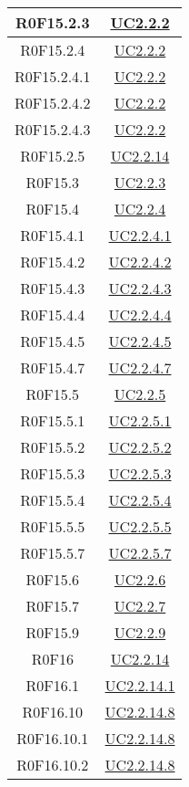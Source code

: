 \documentclass[../AnalisiDeiRequisiti.tex]{subfiles}
\begin{document}
\begin{longtable}{|c|c|}
	R0F15.2.3 & \hyperlink{UC2.2.2}{UC2.2.2}\\\hline
	R0F15.2.4 & \hyperlink{UC2.2.2}{UC2.2.2}\\\hline
	R0F15.2.4.1 & \hyperlink{UC2.2.2}{UC2.2.2}\\\hline
	R0F15.2.4.2 & \hyperlink{UC2.2.2}{UC2.2.2}\\\hline
	R0F15.2.4.3 & \hyperlink{UC2.2.2}{UC2.2.2}\\\hline
	R0F15.2.5 & \hyperlink{UC2.2.14}{UC2.2.14}\\\hline
	R0F15.3 & \hyperlink{UC2.2.3}{UC2.2.3}\\\hline
	R0F15.4 & \hyperlink{UC2.2.4}{UC2.2.4}\\\hline
	R0F15.4.1 & \hyperlink{UC2.2.4.1}{UC2.2.4.1}\\\hline
	R0F15.4.2 & \hyperlink{UC2.2.4.2}{UC2.2.4.2}\\\hline
	R0F15.4.3 & \hyperlink{UC2.2.4.3}{UC2.2.4.3}\\\hline
	R0F15.4.4 & \hyperlink{UC2.2.4.4}{UC2.2.4.4}\\\hline
	R0F15.4.5 & \hyperlink{UC2.2.4.5}{UC2.2.4.5}\\\hline
	R0F15.4.7 & \hyperlink{UC2.2.4.7}{UC2.2.4.7}\\\hline
	R0F15.5 & \hyperlink{UC2.2.5}{UC2.2.5}\\\hline
	R0F15.5.1 & \hyperlink{UC2.2.5.1}{UC2.2.5.1}\\\hline
	R0F15.5.2 & \hyperlink{UC2.2.5.2}{UC2.2.5.2}\\\hline
	R0F15.5.3 & \hyperlink{UC2.2.5.3}{UC2.2.5.3}\\\hline
	R0F15.5.4 & \hyperlink{UC2.2.5.4}{UC2.2.5.4}\\\hline
	R0F15.5.5 & \hyperlink{UC2.2.5.5}{UC2.2.5.5}\\\hline
	R0F15.5.7 & \hyperlink{UC2.2.5.7}{UC2.2.5.7}\\\hline
	R0F15.6 & \hyperlink{UC2.2.6}{UC2.2.6}\\\hline
	R0F15.7 & \hyperlink{UC2.2.7}{UC2.2.7}\\\hline
	R0F15.9 & \hyperlink{UC2.2.9}{UC2.2.9}\\\hline
	R0F16 & \hyperlink{UC2.2.14}{UC2.2.14}\\\hline
	R0F16.1 & \hyperlink{UC2.2.14.1}{UC2.2.14.1}\\\hline
	R0F16.10 & \hyperlink{UC2.2.14.8}{UC2.2.14.8}\\\hline
	R0F16.10.1 & \hyperlink{UC2.2.14.8}{UC2.2.14.8}\\\hline
	R0F16.10.2 & \hyperlink{UC2.2.14.8}{UC2.2.14.8}\\\hline

\end{longtable}
\end{document}
